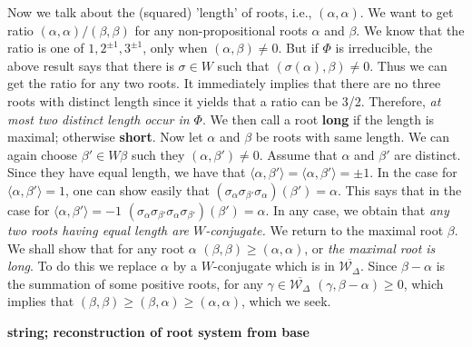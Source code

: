 \documentclass{article}
\begin{document}
Now we talk about the (squared) 'length' of roots, i.e., $(\alpha, \alpha)$.
We want to get ratio $(\alpha, \alpha) / (\beta, \beta)$ for any non-propositional roots $\alpha$ and $\beta$.
We know that the ratio is one of $1, 2^{\pm 1}, 3^{\pm 1}$, only when $(\alpha, \beta) \ne 0$.
But if $\Phi$ is irreducible, the above result says that there is $\sigma \in W$ such that $(\sigma(\alpha), \beta) \ne 0$.
Thus we can get the ratio for any two roots.
It immediately implies that there are no three roots with distinct length since it yields that a ratio can be 3/2.
Therefore, \textit{at most two distinct length occur in $\Phi$}.
We then call a root \textbf{long} if the length is maximal; otherwise \textbf{short}.
Now let $\alpha$ and $\beta$ be roots with same length.
We can again choose $\beta' \in W\beta$ such they $(\alpha, \beta') \ne 0$.
Assume that $\alpha$ and $\beta'$ are distinct.
Since they have equal length, we have that $\langle \alpha, \beta' \rangle = \langle \alpha, \beta' \rangle = \pm 1$.
In the case for $\langle \alpha, \beta' \rangle = 1$, one can show easily that $(\sigma_\alpha \sigma_{\beta'} \sigma_\alpha)(\beta') = \alpha$.
This says that in the case for $\langle \alpha, \beta' \rangle = -1$ $(\sigma_\alpha \sigma_{\beta'} \sigma_\alpha \sigma_{\beta'})(\beta') = \alpha$.
In any case, we obtain that \textit{any two roots having equal length are $W$-conjugate.}
We return to the maximal root $\beta$.
We shall show that for any root $\alpha$ $(\beta, \beta) \ge (\alpha, \alpha)$, or \textit{the maximal root is long}.
To do this we replace $\alpha$ by a $W$-conjugate which is in $\overline{\mathcal{W}_\Delta}$.
Since $\beta - \alpha$ is the summation of some positive roots, for any $\gamma \in \overline{\mathcal{W}_\Delta}$ $(\gamma, \beta - \alpha) \ge 0$, which implies that $(\beta, \beta) \ge (\beta, \alpha) \ge (\alpha, \alpha)$, which we seek.

\newpage

\textbf{string; reconstruction of root system from base}
\end{document}
